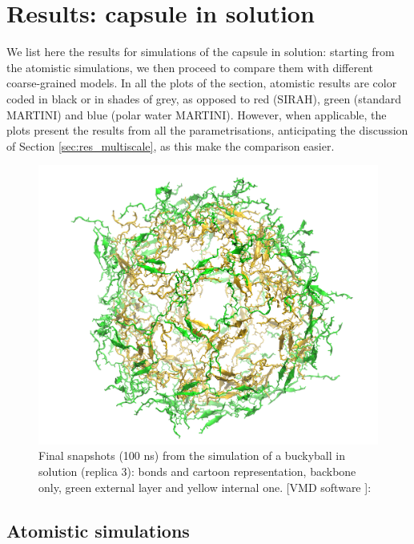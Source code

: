 \section{Results: capsule in solution} \label{sec:results_cap}
We list here the results for simulations of the capsule in solution: starting from the atomistic simulations, we then proceed to compare them with different coarse-grained models. In all the plots of the section, atomistic results are color coded in black or in shades of grey, as opposed to red (SIRAH), green (standard MARTINI) and blue (polar water MARTINI). However, when applicable, the plots present the results from all the parametrisations, anticipating the discussion of Section \ref{sec:res_multiscale}, as this make the comparison easier.

\begin{figure}[t]
\centering
\includegraphics[width=0.5\linewidth]{3results_capsule/pics/staR3_render}
\caption[Atomistic run of buckyball in solution: final configuration]{Final snapshots (100 ns) from the simulation of a buckyball in solution (replica 3): bonds and cartoon representation, backbone only, green external layer and yellow internal one. [VMD software \citet{HUMP96}]: }
\label{fig:BTI_snap}
\end{figure}

\subsection{Atomistic simulations}


